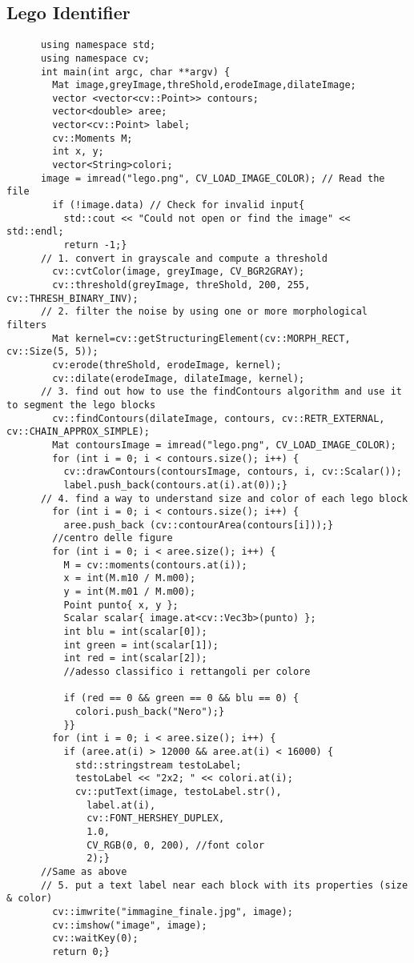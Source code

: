 \documentclass[8pt,a4paper]{article}
\begin{document}
\begin{multicols}{5}
    \subsection{Lego Identifier}
    \noindent
    \begin{verbatim}
      using namespace std; 
      using namespace cv;
      int main(int argc, char **argv) {
        Mat image,greyImage,threShold,erodeImage,dilateImage;
        vector <vector<cv::Point>> contours;
        vector<double> aree;
        vector<cv::Point> label;
        cv::Moments M;
        int x, y;
        vector<String>colori;
      image = imread("lego.png", CV_LOAD_IMAGE_COLOR); // Read the file
        if (!image.data) // Check for invalid input{
          std::cout << "Could not open or find the image" << std::endl;
          return -1;}
      // 1. convert in grayscale and compute a threshold
        cv::cvtColor(image, greyImage, CV_BGR2GRAY);
        cv::threshold(greyImage, threShold, 200, 255, cv::THRESH_BINARY_INV);
      // 2. filter the noise by using one or more morphological filters
        Mat kernel=cv::getStructuringElement(cv::MORPH_RECT, cv::Size(5, 5));
        cv:erode(threShold, erodeImage, kernel);
        cv::dilate(erodeImage, dilateImage, kernel);
      // 3. find out how to use the findContours algorithm and use it to segment the lego blocks
        cv::findContours(dilateImage, contours, cv::RETR_EXTERNAL, cv::CHAIN_APPROX_SIMPLE);
        Mat contoursImage = imread("lego.png", CV_LOAD_IMAGE_COLOR);
        for (int i = 0; i < contours.size(); i++) {
          cv::drawContours(contoursImage, contours, i, cv::Scalar());
          label.push_back(contours.at(i).at(0));}
      // 4. find a way to understand size and color of each lego block
        for (int i = 0; i < contours.size(); i++) {
          aree.push_back (cv::contourArea(contours[i]));}
        //centro delle figure
        for (int i = 0; i < aree.size(); i++) {
          M = cv::moments(contours.at(i));
          x = int(M.m10 / M.m00);
          y = int(M.m01 / M.m00);
          Point punto{ x, y };
          Scalar scalar{ image.at<cv::Vec3b>(punto) };
          int blu = int(scalar[0]);
          int green = int(scalar[1]);
          int red = int(scalar[2]);
          //adesso classifico i rettangoli per colore

          if (red == 0 && green == 0 && blu == 0) {
            colori.push_back("Nero");}
          }}
        for (int i = 0; i < aree.size(); i++) {
          if (aree.at(i) > 12000 && aree.at(i) < 16000) {
            std::stringstream testoLabel;
            testoLabel << "2x2; " << colori.at(i);
            cv::putText(image, testoLabel.str(),
              label.at(i), 
              cv::FONT_HERSHEY_DUPLEX,
              1.0,
              CV_RGB(0, 0, 200), //font color
              2);}
      //Same as above
      // 5. put a text label near each block with its properties (size & color)
        cv::imwrite("immagine_finale.jpg", image);
        cv::imshow("image", image);
        cv::waitKey(0);
        return 0;}
    \end{verbatim}

\end{multicols}
\end{document}
